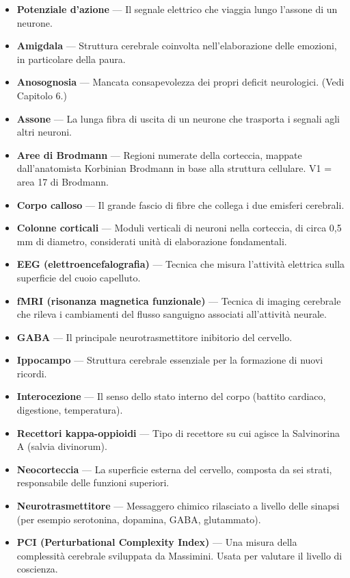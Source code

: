 \documentclass[11pt, twoside, openright]{book}
\begin{document}
\begin{itemize}
  \item \textbf{Potenziale d'azione} --- Il segnale elettrico che viaggia lungo l'assone di un neurone.
  \item \textbf{Amigdala} --- Struttura cerebrale coinvolta nell'elaborazione delle emozioni, in particolare della paura.
  \item \textbf{Anosognosia} --- Mancata consapevolezza dei propri deficit neurologici. (Vedi Capitolo 6.)
  \item \textbf{Assone} --- La lunga fibra di uscita di un neurone che trasporta i segnali agli altri neuroni.
  \item \textbf{Aree di Brodmann} --- Regioni numerate della corteccia, mappate dall'anatomista Korbinian Brodmann in base alla struttura cellulare. V1 = area 17 di Brodmann.
  \item \textbf{Corpo calloso} --- Il grande fascio di fibre che collega i due emisferi cerebrali.
  \item \textbf{Colonne corticali} --- Moduli verticali di neuroni nella corteccia, di circa 0,5 mm di diametro, considerati unità di elaborazione fondamentali.
  \item \textbf{EEG (elettroencefalografia)} --- Tecnica che misura l'attività elettrica sulla superficie del cuoio capelluto.
  \item \textbf{fMRI (risonanza magnetica funzionale)} --- Tecnica di imaging cerebrale che rileva i cambiamenti del flusso sanguigno associati all'attività neurale.
  \item \textbf{GABA} --- Il principale neurotrasmettitore inibitorio del cervello.
  \item \textbf{Ippocampo} --- Struttura cerebrale essenziale per la formazione di nuovi ricordi.
  \item \textbf{Interocezione} --- Il senso dello stato interno del corpo (battito cardiaco, digestione, temperatura).
  \item \textbf{Recettori kappa-oppioidi} --- Tipo di recettore su cui agisce la Salvinorina A (salvia divinorum).
  \item \textbf{Neocorteccia} --- La superficie esterna del cervello, composta da sei strati, responsabile delle funzioni superiori.
  \item \textbf{Neurotrasmettitore} --- Messaggero chimico rilasciato a livello delle sinapsi (per esempio serotonina, dopamina, GABA, glutammato).
  \item \textbf{PCI (Perturbational Complexity Index)} --- Una misura della complessità cerebrale sviluppata da Massimini. Usata per valutare il livello di coscienza.

\end{itemize}
\end{document}
